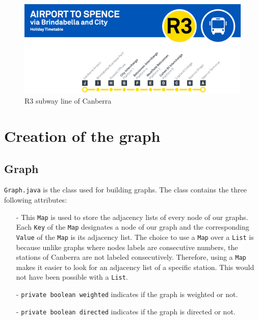 \documentclass{article}
\begin{document}
\begin{figure}[h]
\begin{center}
	\includegraphics[scale=1]{assets/R3}
\end{center}
\caption{R3 subway line of Canberra}
\end{figure} 

\section{Creation of the graph}

\subsection{Graph}

\texttt{Graph.java} is the class used for building graphs.
The class contains the three following attributes:

\begin{itemize}
\item[-] This \texttt{Map} is used to store the adjacency lists of every node of our graphs. Each \texttt{Key} of the \texttt{Map} designates a node of our graph and the corresponding \texttt{Value} of the \texttt{Map} is its adjacency list. The choice to use a \texttt{Map} over a \texttt{List} is because unlike graphs where nodes labels are consecutive numbers, the stations of Canberra are not labeled consecutively. Therefore, using a \texttt{Map} makes it easier to look for an adjacency list of a specific station. This would not have been possible with a \texttt{List}. 
\item[-]\texttt{private boolean weighted} indicates if the graph is weighted or not.
\item[-]\texttt{private boolean directed} indicates if the graph is directed or not.
\end{itemize}
\end{document}
